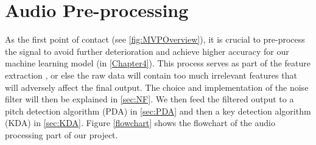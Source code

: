 \chapter{Audio Pre-processing} %
\label{Chapter5} %
As the first point of contact (see \cref{fig:MVPOverview}), it is crucial to pre-process the signal to avoid further deterioration
and achieve higher accuracy for our machine learning model (in \cref{Chapter4}). This process serves as part of the feature extraction , or else the raw data will contain too much irrelevant features that will adversely affect the final output. 
The choice and implementation of the noise filter will then be explained in \cref{sec:NF}. We then feed the filtered output 
to a pitch detection algorithm (PDA) in \cref{sec:PDA} and then a key detection algorithm (KDA) in \cref{sec:KDA}.
Figure \cref{flowchart} shows the flowchart of the audio processing part of our project.

        
        

